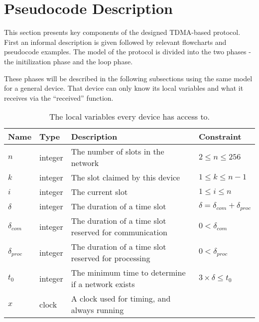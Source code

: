 \section{Pseudocode Description}\label{sec:Pseudo}
This section presents key components of the designed TDMA-based protocol. 
First an informal description is given followed by relevant flowcharts and pseudocode examples. 
The model of the protocol is divided into the two phases - the initilization phase and the loop phase. 

These phases will be described in the following subsections using the same model for a general device. 
That device can only know its local variables and what it receives via the \enquote{received} function.

\begin{table}[H]
    \begin{tabularx}{\textwidth}{l|l|X|l}
        \toprule
        Name                & Type      & Description & Constraint \\
        \midrule
        $n$                 & integer   & The number of slots in the network                        & $2 \leq n \leq 256$\\
        $k$                 & integer   & The slot claimed by this device                           & $1 \leq k \leq n - 1$\\
        $i$                 & integer   & The current slot                                          & $1 \leq i \leq n$\\
        $\delta$            & integer   & The duration of a time slot                               & $\delta = \delta_{com} + \delta_{proc}$\\
        $\delta_{com}$      & integer   & The duration of a time slot reserved for communication    & $0 < \delta_{com}$ \\
        $\delta_{proc}$     & integer   & The duration of a time slot reserved for processing       & $0 < \delta_{proc}$ \\
        $t_0$               & integer   & The minimum time to determine if a network exists         & $3 \times \delta \leq t_0$ \\
        $x$                 & clock     & A clock used for timing, and always running\\
        \bottomrule
    \end{tabularx}
    \caption{The local variables every device has access to.}
    \label{tab:locals}
\end{table}

